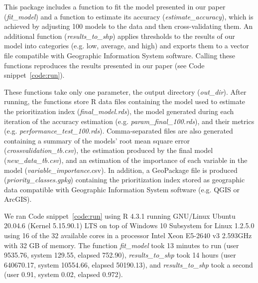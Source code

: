 \documentclass[12pt]{article}
\begin{document}


This package includes a function to fit the model presented in our paper (\textit{fit\_model}) and a function to estimate its accuracy (\textit{estimate\_accuracy}), which is achieved by adjusting 100 models to the data and then cross-validating them.
An additional function (\textit{results\_to\_shp}) applies thresholds to the results of our model into categories (e.g. low, average, and high) and exports them to a vector file compatible with Geographic Information System software.
Calling these functions reproduces the results presented in our paper (see Code snippet~\ref{code:run}).

These functions take only one parameter, the output directory (\textit{out\_dir}).
After running, the functions store R data files containing the model used to estimate the prioritization index (\textit{final\_model.rds}), the model generated during each iteration of the accuracy estimation (e.g. \textit{param\_final\_100.rds}), and their metrics (e.g. \textit{performance\_test\_100.rds}).
Comma-separated files are also generated containing a summary of the models' root mean square error (\textit{crossvalidation\_tb.csv}), the estimation produced by the final model (\textit{new\_data\_tb.csv}), and an estimation of the importance of each variable in the model (\textit{variable\_importance}.csv). 
In addition, a GeoPackage file is produced (\textit{priority\_classes.gpkg}) containing the prioritization index stored as geographic data compatible with Geographic Information System software (e.g. QGIS or ArcGIS).





We ran Code snippet~\ref{code:run} using \textsf{R} 4.3.1 running GNU/Linux Ubuntu 20.04.6 (Kernel 5.15.90.1) LTS on top of Windows 10 Subsystem for Linux 1.2.5.0 using 16 of the 32 available cores in a processor Intel Xeon E5-2640 v3 2.593GHz with 32 GB of memory.
The function \textit{fit\_model} took 13 minutes to run
(user 9535.76, system 129.55, elapsed 752.90),  \textit{results\_to\_shp} took 14 hours (user 640670.17, system 10554.66, elapsed 50190.13), and \textit{results\_to\_shp} took a second (user 0.91,  system 0.02, elapsed 0.972).
\end{document}
